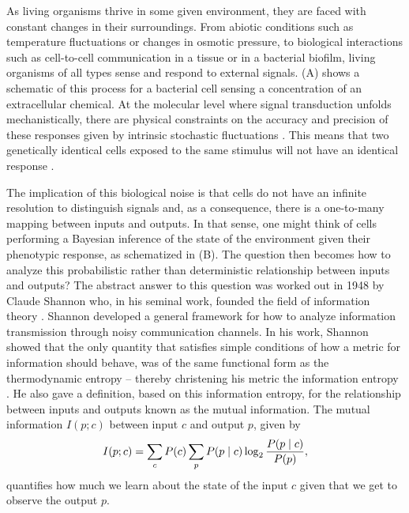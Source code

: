 As living organisms thrive in some given environment, they are faced with
constant changes in their surroundings. From abiotic conditions such as
temperature fluctuations or changes in osmotic pressure, to biological
interactions such as cell-to-cell communication in a tissue or in a bacterial
biofilm, living organisms of all types sense and respond to external signals.
(A) shows a schematic of this process for a bacterial cell
sensing a concentration of an extracellular chemical. At the molecular level
where signal transduction unfolds mechanistically, there are physical
constraints on the accuracy and precision of these responses given by
intrinsic stochastic fluctuations \cite{Nemenman2010}. This means that two
genetically identical cells exposed to the same stimulus will not have an
identical response \cite{Eldar2010}.

The implication of this biological noise is that cells do not have an infinite
resolution to distinguish signals and, as a consequence, there is a one-to-many
mapping between inputs and outputs. In that sense, one might think of cells
performing a Bayesian inference of the state of the environment given their
phenotypic response, as schematized in (B). The question then
becomes how to analyze this probabilistic rather than deterministic relationship
between inputs and outputs? The abstract answer to this question was worked out
in 1948 by Claude Shannon who, in his seminal work, founded the field of
information theory \cite{Shannon1948}. Shannon developed a general framework for
how to analyze information transmission through noisy communication channels. In
his work, Shannon showed that the only quantity that satisfies simple conditions
of how a metric for information should behave, was of the same functional form
as the thermodynamic entropy -- thereby christening his metric the information
entropy \cite{MacKay2003}. He also gave a definition, based on this information
entropy, for the relationship between inputs and outputs known as the mutual
information. The mutual information $I(p; c)$ between input $c$ and output $p$,
given by
\begin{equation}
  I(p; c) = \sum_c P(c) \sum_p P(p \mid c) \log_2 {P(p \mid c) \over P(p)},
	\label{eq_mutual_info}
\end{equation}
quantifies how much we learn about the state of the input $c$ given that we get
to observe the output $p$.

